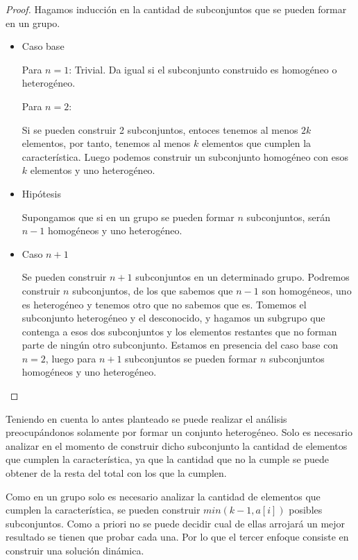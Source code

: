 \documentclass{article}
\begin{document}
\begin{proof}
    Hagamos inducción en la cantidad de subconjuntos que se pueden formar en un grupo.

    \begin{itemize}
        \item Caso base
    
        Para $n=1$:
        Trivial. Da igual si el subconjunto construido es homogéneo o heterogéneo.

        Para $n=2$:

        Si se pueden construir 2 subconjuntos, entoces tenemos al menos $2k$ elementos, por tanto, 
        tenemos al menos $k$ elementos que cumplen la característica. Luego podemos construir 
        un subconjunto homogéneo con esos $k$ elementos y uno heterogéneo.
        
        \item Hipótesis
        
        Supongamos que si en un grupo se pueden formar $n$ subconjuntos, 
        serán $n-1$ homogéneos y uno heterogéneo.

        \item Caso $n+1$
        
        Se pueden construir $n+1$ subconjuntos en un determinado grupo. Podremos construir 
        $n$ subconjuntos, de los que sabemos que $n-1$ son homogéneos, uno es heterogéneo y 
        tenemos otro que no sabemos que es. Tomemos el subconjunto heterogéneo y el desconocido, 
        y hagamos un subgrupo que contenga a esos dos subconjuntos y los elementos restantes que no forman
        parte de ningún otro subconjunto. Estamos en presencia del caso base 
        con $n=2$, luego para $n+1$ subconjuntos se pueden formar $n$ subconjuntos homogéneos y uno heterogéneo.
    \end{itemize}
\end{proof}

Teniendo en cuenta lo antes planteado se puede realizar el análisis preocupándonos solamente por 
formar un conjunto heterogéneo. Solo es necesario analizar en el momento de construir dicho subconjunto
la cantidad de elementos que cumplen la característica, ya que la cantidad que no la cumple se puede obtener de 
la resta del total con los que la cumplen.

Como en un grupo solo es necesario analizar la cantidad de elementos que cumplen la característica, se pueden construir 
$min(k-1, a[i])$ posibles subconjuntos. Como a priori no se puede decidir cual de ellas arrojará un mejor resultado se tienen 
que probar cada una. Por lo que
el tercer enfoque consiste en construir una solución dinámica.
\end{document}
